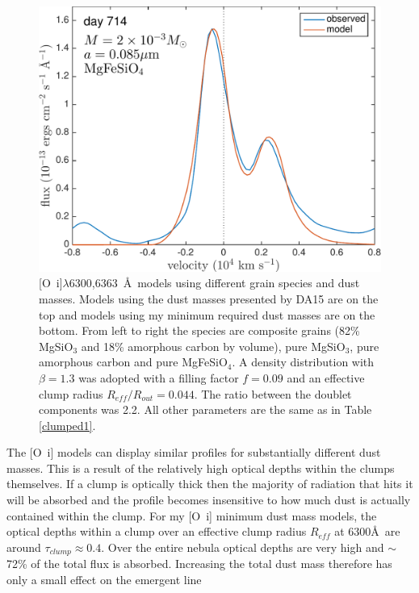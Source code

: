 \begin{landscape}
\begin{figure}
\includegraphics[trim =25 0 0 -25,clip=true,scale=0.33]{chapters/chapter5/images/silicates_take2/OI/MgFeSiO4_bestfit.pdf}

\caption{[O~{\sc i}]$\lambda$6300,6363~\AA\ models using different grain 
species and dust masses.  Models using the dust masses presented by DA15 
are on the top and models using my minimum required dust masses are on 
the bottom.  From left to right the species are composite grains (82\% 
MgSiO$_3$ and 18\% amorphous carbon by volume), pure MgSiO$_3$, pure 
amorphous carbon and pure MgFeSiO$_4$.  A density distribution with 
$\beta=1.3$ was adopted with a filling factor $f=0.09$ and an effective 
clump radius $R_{eff}/R_{out}=0.044$. The ratio between the 
doublet components was 2.2. All other parameters are the same as in 
Table \ref{clumped1}.}
\label{Dwek_models_OI}
\end{figure}
\end{landscape}
The [O~{\sc i}] models can display similar profiles for substantially 
different dust masses.  This is a result of the relatively high optical 
depths within the clumps themselves. If a clump is optically thick then 
the majority of radiation that hits it will be absorbed and the profile 
becomes insensitive to how much dust is actually contained within the 
clump.  For my [O~{\sc i}] minimum dust mass models, the optical depths 
within a clump over an effective clump radius $R_{eff}$ at 6300\AA\ are 
around $\tau_{clump} \approx 0.4$.  Over the entire nebula optical depths 
are very high and $\sim$72\% of the total flux is absorbed.  Increasing the 
total dust mass therefore has only a small effect on the emergent line 
